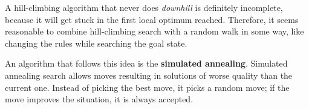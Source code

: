 A hill-climbing algorithm that never does \textit{downhill} is definitely incomplete, because it will get stuck in the first local optimum reached. Therefore, it seems
reasonable to combine hill-climbing search with a random walk in some way, like changing the rules while searching the goal state. \vspace{3.5pt}

An algorithm that follows this idea is the \textbf{simulated annealing}. Simulated annealing search allows moves resulting in solutions of worse quality than the current one.
Instead of picking the best move, it picks a random move; if the move improves the situation, it is always accepted.